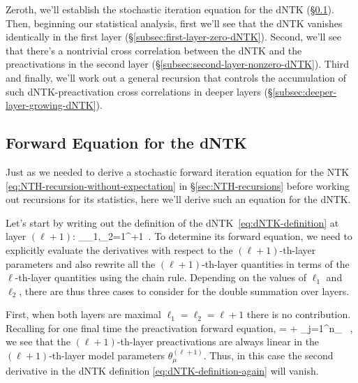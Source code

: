 Zeroth, we'll establish the stochastic iteration equation for the dNTK (\S\ref{subsec:dNTK-recursions}). Then, beginning our statistical analysis, first we'll see that the dNTK vanishes identically in the first layer (\S\ref{subsec:first-layer-zero-dNTK}). Second, we'll see that there's a nontrivial cross correlation between the dNTK and the preactivations in the second layer (\S\ref{subsec:second-layer-nonzero-dNTK}). Third and finally, we'll work out a general recursion that controls the accumulation of such dNTK-preactivation cross correlations in deeper layers (\S\ref{subsec:deeper-layer-growing-dNTK}).



\setcounter{subsection}{-1}
\subsection{Forward Equation for the dNTK}\label{subsec:dNTK-recursions}
Just as we needed to derive a stochastic forward iteration equation for the NTK \eqref{eq:NTH-recursion-without-expectation}  in \S\ref{sec:NTH-recursions} before working out recursions for its statistics, here we'll derive such an equation for the dNTK.

Let's start by writing out the definition of the dNTK~\eqref{eq:dNTK-definition} at layer $(\ell+1)$:
\be\label{eq:dNTK-definition-again}
\equiv\sum_{\ell_1,\ell_2=1}^{\ell+1}\, .
\ee
To determine its forward equation, we need to explicitly evaluate the derivatives with respect to the  $(\ell+1)$-th-layer parameters and also rewrite all the $(\ell+1)$-th-layer quantities in terms of the $\ell$-th-layer quantities using the chain rule. Depending on the values of $\ell_1$ and $\ell_2$, there are thus three cases to consider 
for the double summation over layers. 

First, when both layers are maximal $\ell_1=\ell_2=\ell+1$ there is no contribution. Recalling 
for one final time the preactivation forward equation, %
\be\label{eq:mlp-foward-pass-reprint-lol}
 =  + \sum_{j=1}^{n_\ell}  \, ,
\ee
we see that the $(\ell+1)$-th-layer preactivations are always linear in 
the $(\ell+1)$-th-layer model parameters $\theta^{(\ell+1)}_{\mu}$.
Thus, in this case the second derivative in the dNTK definition \eqref{eq:dNTK-definition-again} will vanish.

